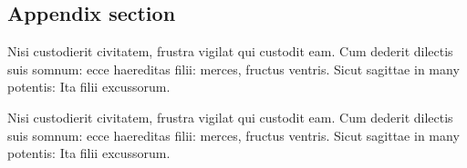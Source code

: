 \documentclass{nejsds}
\theoremstyle{remark}
\begin{document}
\begin{esm}
\end{esm}

\begin{appendix}

\section{Appendix section}

Nisi custodierit civitatem,
frustra vigilat qui custodit eam. Cum dederit dilectis suis somnum:
ecce haereditas filii: merces, fructus ventris. Sicut sagittae in
many potentis: Ita filii excussorum.

Nisi custodierit civitatem,
frustra vigilat qui custodit eam. Cum dederit dilectis suis somnum:
ecce haereditas filii: merces, fructus ventris. Sicut sagittae in
many potentis: Ita filii excussorum.

\end{appendix}

\nocite{*}



\end{document}
